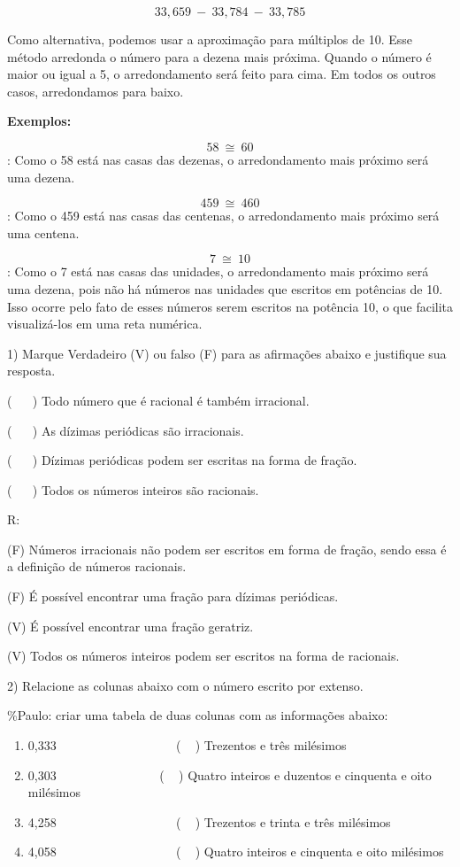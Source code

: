 \[33,659\  - \ 33,784\  - \ 33,785\]

Como alternativa, podemos usar a aproximação para múltiplos de 10. Esse
método arredonda o número para a dezena mais próxima. Quando o número é
maior ou igual a 5, o arredondamento será feito para cima. Em todos os
outros casos, arredondamos para baixo.

\textbf{Exemplos:}

\[58\  \cong \ 60\]: Como o 58 está nas casas das dezenas, o
arredondamento mais próximo será uma dezena.

\[459\  \cong \ 460\]: Como o 459 está nas casas das centenas, o
arredondamento mais próximo será uma centena.

\[7\  \cong \ 10\]: Como o 7 está nas casas das unidades, o
arredondamento mais próximo será uma dezena, pois não há números nas
unidades que escritos em potências de 10. Isso ocorre pelo fato de esses
números serem escritos na potência 10, o que facilita visualizá-los em
uma reta numérica.


1) Marque Verdadeiro (V) ou falso (F) para as afirmações abaixo e
justifique sua resposta.

(~ ~ ) Todo número que é racional é também irracional.

(~ ~ ) As dízimas periódicas são irracionais.

(~ ~ ) Dízimas periódicas podem ser escritas na forma de fração.

(~ ~ ) Todos os números inteiros são racionais.~

R:

(F) Números irracionais não podem ser escritos em forma de fração, sendo
essa é a definição de números racionais.

(F) É possível encontrar uma fração para dízimas periódicas.

(V) É possível encontrar uma fração geratriz.

(V) Todos os números inteiros podem ser escritos na forma de racionais.

2) Relacione as colunas abaixo com o número escrito por extenso.

\%Paulo: criar uma tabela de duas colunas com as informações abaixo:

\begin{enumerate}
\def\labelenumi{\alph{enumi})}
\item
  0,333~ ~ ~ ~ ~ ~ ~ ~ ~ ~ ~ ~( ~ ) Trezentos e três milésimos~
\item
  0,303~ ~ ~ ~ ~ ~ ~ ~ ~ ~ ( ~ ) Quatro inteiros e duzentos e cinquenta
  e oito milésimos
\item
  4,258~ ~ ~ ~ ~ ~ ~ ~ ~ ~ ~ ~( ~ ) Trezentos e trinta e três milésimos
\item
  4,058~ ~ ~ ~ ~ ~ ~ ~ ~ ~ ~ ~( ~ ) Quatro inteiros e cinquenta e oito
  milésimos
\end{enumerate}


